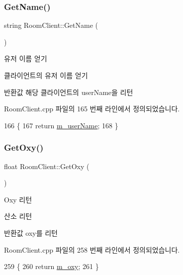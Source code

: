\subsubsection{\texorpdfstring{Get\+Name()}{GetName()}}
{\footnotesize\ttfamily string Room\+Client\+::\+Get\+Name (\begin{DoxyParamCaption}{ }\end{DoxyParamCaption})}



유저 이름 얻기 

클라이언트의 유저 이름 얻기

\begin{DoxyReturn}{반환값}
해당 클라이언트의 user\+Name을 리턴 
\end{DoxyReturn}


Room\+Client.\+cpp 파일의 165 번째 라인에서 정의되었습니다.


\begin{DoxyCode}
166 \{ 
167     \textcolor{keywordflow}{return} \hyperlink{class_room_client_ae501fdc166c6ae17dc2286ecd382ae71}{m\_userName}; 
168 \}
\end{DoxyCode}
\mbox{\label{class_room_client_a5d43788e44e43ddf5ac897195ab2d977}} 
\subsubsection{\texorpdfstring{Get\+Oxy()}{GetOxy()}}
{\footnotesize\ttfamily float Room\+Client\+::\+Get\+Oxy (\begin{DoxyParamCaption}{ }\end{DoxyParamCaption})}



Oxy 리턴 

산소 리턴

\begin{DoxyReturn}{반환값}
oxy를 리턴 
\end{DoxyReturn}


Room\+Client.\+cpp 파일의 258 번째 라인에서 정의되었습니다.


\begin{DoxyCode}
259 \{
260     \textcolor{keywordflow}{return} \hyperlink{class_room_client_a8c0bd64aa8b2d03f23b9a1ab5c2c2c1a}{m\_oxy};
261 \}
\end{DoxyCode}
\mbox{\label{class_room_client_a3016a1d1ab8ec0976c11e85c4c7312e5}} 

